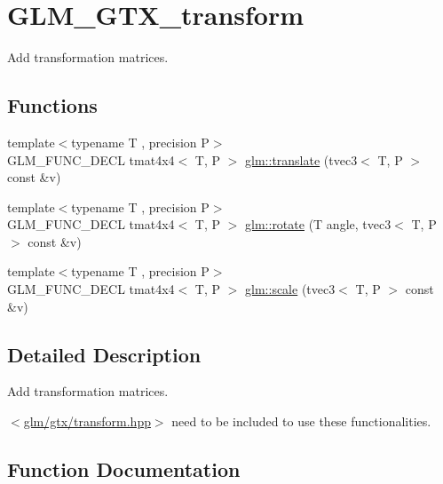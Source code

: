 \hypertarget{group__gtx__transform}{}\section{G\+L\+M\+\_\+\+G\+T\+X\+\_\+transform}
\label{group__gtx__transform}


Add transformation matrices.  


\subsection*{Functions}
\begin{DoxyCompactItemize}
\item 
{\footnotesize template$<$typename T , precision P$>$ }\\G\+L\+M\+\_\+\+F\+U\+N\+C\+\_\+\+D\+E\+C\+L tmat4x4$<$ T, P $>$ \hyperlink{group__gtx__transform_ga838c4505ef7f254ed05117b1ac9691fb}{glm\+::translate} (tvec3$<$ T, P $>$ const \&v)
\item 
{\footnotesize template$<$typename T , precision P$>$ }\\G\+L\+M\+\_\+\+F\+U\+N\+C\+\_\+\+D\+E\+C\+L tmat4x4$<$ T, P $>$ \hyperlink{group__gtx__transform_ga2020c91bf61e050882b3a5c18eada700}{glm\+::rotate} (T angle, tvec3$<$ T, P $>$ const \&v)
\item 
{\footnotesize template$<$typename T , precision P$>$ }\\G\+L\+M\+\_\+\+F\+U\+N\+C\+\_\+\+D\+E\+C\+L tmat4x4$<$ T, P $>$ \hyperlink{group__gtx__transform_ga1972d4a66a2e92637c8aaee598417a71}{glm\+::scale} (tvec3$<$ T, P $>$ const \&v)
\end{DoxyCompactItemize}


\subsection{Detailed Description}
Add transformation matrices. 

$<$\hyperlink{transform_8hpp}{glm/gtx/transform.\+hpp}$>$ need to be included to use these functionalities. 

\subsection{Function Documentation}
\hypertarget{group__gtx__transform_ga2020c91bf61e050882b3a5c18eada700}{}
